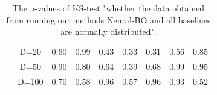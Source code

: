 \begin{table}[]
{\begin{tabular}{|cc|c|c|c|c|c|c|c|}
\multicolumn{1}{|c|}{}                                                                                  & D=20  & 0.60                                                         & 0.99                                                             & 0.43                                                      & 0.33                                                     & 0.31                                                     & 0.56          & 0.85        \\ \cline{2-9} 
\multicolumn{1}{|c|}{}                                                                                  & D=50  & 0.90                                                         & 0.80                                                             & 0.64                                                      & 0.39                                                     & 0.68                                                     & 0.99          & 0.95        \\ \cline{2-9} 
\multicolumn{1}{|c|}{}                                                                                  & D=100 & 0.70                                                         & 0.58                                                             & 0.96                                                      & 0.57                                                     & 0.96                                                     & 0.93          & 0.52        \\ \hline
\end{tabular}
}
\caption{The p-values of KS-test "whether the data obtained from running our methods Neural-BO and all baselines are normally distributed".}
\label{tab:neural-bo_ks_test}
\end{table}



